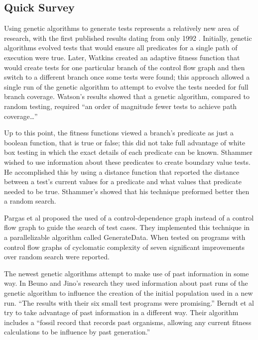 \documentclass[runningheads]{llncs}
\begin{document}
\subsection{Quick Survey}
Using genetic algorithms to generate tests represents a relatively new area of research, with the first published results dating from only 1992 \cite{apps5}. Initially, genetic algorithms evolved tests that would ensure all predicates for a single path of execution were true\cite{limits6}. Later, Watkins created an adaptive fitness function that would create tests for one particular branch of the control flow graph and then switch to a different branch once some tests were found; this approach allowed a single run of the genetic algorithm to attempt to evolve the tests needed for full branch coverage\cite{limits6}. Watson's results showed that a genetic algorithm, compared to random testing, required ``an order of magnitude fewer tests to achieve path coverage…''\cite{limits6} 

Up to this point, the fitness functions viewed a branch's predicate as just a boolean function, that is true or false; this did not take full advantage of white box testing in which the exact details of each predicate can be known. Sthammer wished to use information about these predicates to create boundary value tests. He accomplished this by using a distance function that reported the distance between a test's current values for a predicate and what values that predicate needed to be true. Sthammer's showed that his technique preformed better then a random search. 

Pargas et al proposed the used of a control-dependence graph instead of a control flow graph to guide the search of test cases. They implemented this technique in a parallelizable algorithm called GenerateData\cite{pargas8}. When tested on programs with control flow graphs of cyclomatic complexity of seven significant improvements over random search were reported\cite{pargas8}.

The newest genetic algorithms attempt to make use of past information in some way. In Beuno and Jino's research they used information about past runs of the genetic algorithm to influence the creation of the initial population used in a new run\cite{limits6}. ``The results with their six small test programs were promising.''\cite{limits6} Berndt et al try to take advantage of past information in a different way. Their algorithm includes a ``fossil record that records past organisms, allowing any current fitness calculations to be influence by past generation.''\cite{limits6}
\end{document}
